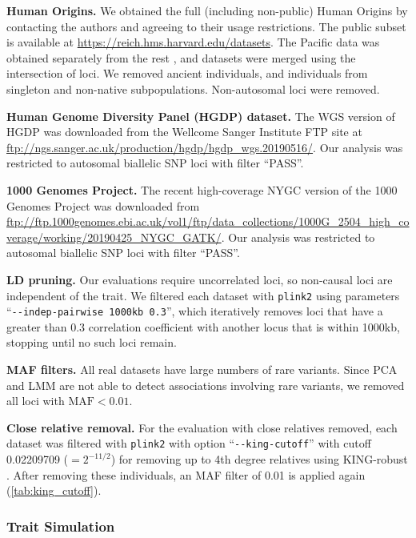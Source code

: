\documentclass[11pt]{article}
\begin{document}
\textbf{Human Origins.}
We obtained the full (including non-public) Human Origins by contacting the authors and agreeing to their usage restrictions.
The public subset is available at \url{https://reich.hms.harvard.edu/datasets}.
The Pacific data \citep{skoglund_genomic_2016} was obtained separately from the rest \citep{lazaridis_ancient_2014,lazaridis_genomic_2016}, and datasets were merged using the intersection of loci.
We removed ancient individuals, and individuals from singleton and non-native subpopulations.
Non-autosomal loci were removed.

\textbf{Human Genome Diversity Panel (HGDP) dataset.}
The WGS version of HGDP \citep{bergstrom_insights_2020} was downloaded from the Wellcome Sanger Institute FTP site at \url{ftp://ngs.sanger.ac.uk/production/hgdp/hgdp_wgs.20190516/}.
Our analysis was restricted to autosomal biallelic SNP loci with filter ``PASS''.

\textbf{1000 Genomes Project.}
The recent high-coverage NYGC version of the 1000 Genomes Project \citep{fairley_international_2020} was downloaded from \url{ftp://ftp.1000genomes.ebi.ac.uk/vol1/ftp/data_collections/1000G_2504_high_coverage/working/20190425_NYGC_GATK/}.
Our analysis was restricted to autosomal biallelic SNP loci with filter ``PASS''.

\textbf{LD pruning.}
Our evaluations require uncorrelated loci, so non-causal loci are independent of the trait.
We filtered each dataset with \texttt{plink2} using parameters ``\texttt{-{}-indep-pairwise 1000kb 0.3}'', which iteratively removes loci that have a greater than 0.3 correlation coefficient with another locus that is within 1000kb, stopping until no such loci remain.

\textbf{MAF filters.}
All real datasets have large numbers of rare variants.
Since PCA and LMM are not able to detect associations involving rare variants, we removed all loci with $\text{MAF} < 0.01$.

\textbf{Close relative removal.}
For the evaluation with close relatives removed, each dataset was filtered with \texttt{plink2} with option ``\texttt{-{}-king-cutoff}'' with cutoff 0.02209709 ($= 2^{-11/2}$) for removing up to 4th degree relatives using KING-robust \citep{manichaikul_robust_2010}.
After removing these individuals, an MAF filter of 0.01 is applied again (\cref{tab:king_cutoff}).

\subsubsection{Trait Simulation}
\end{document}
